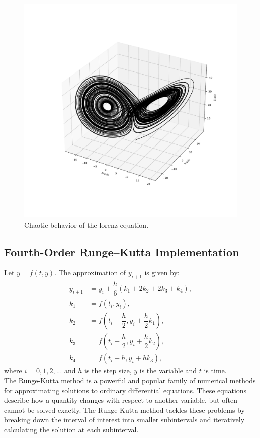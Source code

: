 \documentclass[11pt]{article}
\begin{document}
\begin{figure}
\centering
\includegraphics[trim=2cm 2cm 2cm 2cm, clip, scale=0.3]{Lorenz.pdf}
\caption{Chaotic behavior of the lorenz equation.}
\label{fig:LE}
\end{figure}

\subsection{Fourth-Order Runge–Kutta Implementation}
Let $\dot{y} = f(t,y)$. The approximation of $y_{i+1}$ is given by:
\begin{align*}
y_{i+1} &= y_i + \dfrac{h}{6}(k_1 + 2k_2 + 2k_3 + k_4), \\
k_1 &= f(t_i, y_i), \\
k_2 &= f\left( t_i + \dfrac{h}{2}, y_i + \dfrac{h}{2}k_1 \right), \\
k_3 &= f\left( t_i + \dfrac{h}{2}, y_i + \dfrac{h}{2}k_2 \right), \\
k_4 &= f(t_i + h, y_i + hk_3),
\end{align*}
\label{fig:RK4}
where $i = 0,1,2,...$ and $h$ is the step size, $y$ is the variable and $t$ is time. \\
The Runge-Kutta method \cite{bose_numerical_2019} is a powerful and popular family of numerical methods for approximating solutions to ordinary differential equations. These equations describe how a quantity changes with respect to another variable, but often cannot be solved exactly. The Runge-Kutta method tackles these problems by breaking down the interval of interest into smaller subintervals and iteratively calculating the solution at each subinterval. 
\end{document}
